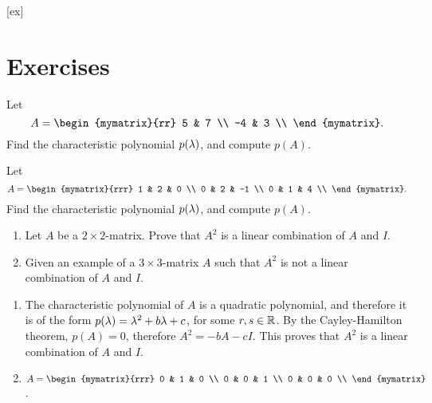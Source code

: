 [ex]
\section*{Exercises}

\begin{enumialphparenastyle}

\begin{ex}
  Let
  \begin{equation*}
    A = \begin{mymatrix}{rr}
      5 & 7 \\
      -4 & 3 \\
    \end{mymatrix}.
  \end{equation*}
  Find the characteristic polynomial $p(\lambda)$, and compute
  $p(A)$.
\end{ex}

\begin{ex}
  Let
  \begin{equation*}
    A = \begin{mymatrix}{rrr}
      1 & 2 & 0 \\
      0 & 2 & -1 \\
      0 & 1 & 4 \\
    \end{mymatrix}.
  \end{equation*}
  Find the characteristic polynomial $p(\lambda)$, and compute
  $p(A)$.
\end{ex}

\begin{ex}
  \begin{enumerate}
  \item Let $A$ be a $2\times 2$-matrix. Prove that $A^2$ is a linear
    combination of $A$ and $I$.
  \item Given an example of a $3\times 3$-matrix $A$ such that $A^2$
    is not a linear combination of $A$ and $I$.
  \end{enumerate}
  \begin{sol}
    \begin{enumerate}
    \item The characteristic polynomial of $A$ is a quadratic
      polynomial, and therefore it is of the form
      $p(\lambda) = \lambda^2 + b\lambda + c$, for some
      $r,s\in\mathbb{R}$. By the Cayley-Hamilton theorem, $p(A)=0$, therefore
      $A^2 = -bA - cI$. This proves that $A^2$ is a linear combination
      of $A$ and $I$.
    \item $A=\begin{mymatrix}{rrr}
        0 & 1 & 0 \\
        0 & 0 & 1 \\
        0 & 0 & 0 \\
      \end{mymatrix}$.
    \end{enumerate}
  \end{sol}
\end{ex}

\end{enumialphparenastyle}

